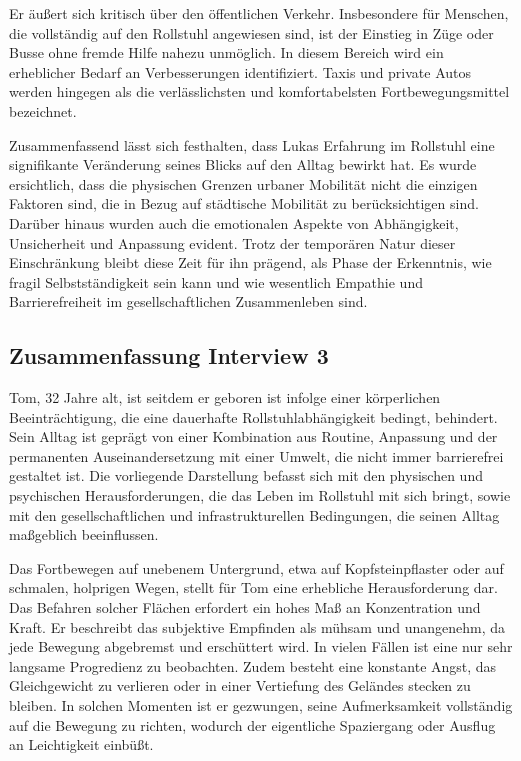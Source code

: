 Er äußert sich kritisch über den öffentlichen Verkehr. Insbesondere für Menschen, die vollständig auf den Rollstuhl angewiesen sind, ist der Einstieg in Züge oder Busse ohne fremde Hilfe nahezu unmöglich. In diesem Bereich wird ein erheblicher Bedarf an Verbesserungen identifiziert. Taxis und private Autos werden hingegen als die verlässlichsten und komfortabelsten Fortbewegungsmittel bezeichnet.

Zusammenfassend lässt sich festhalten, dass Lukas Erfahrung im Rollstuhl eine signifikante Veränderung seines Blicks auf den Alltag bewirkt hat. Es wurde ersichtlich, dass die physischen Grenzen urbaner Mobilität nicht die einzigen Faktoren sind, die in Bezug auf städtische Mobilität zu berücksichtigen sind. Darüber hinaus wurden auch die emotionalen Aspekte von Abhängigkeit, Unsicherheit und Anpassung 
evident. Trotz der temporären Natur dieser Einschränkung bleibt diese Zeit für ihn prägend, als Phase der Erkenntnis, wie fragil Selbstständigkeit sein kann und wie wesentlich Empathie und Barrierefreiheit im gesellschaftlichen Zusammenleben sind.

\cite{ElisaKaltenberger22026}


\subsection{Zusammenfassung Interview 3}
Tom, 32 Jahre alt, ist seitdem er geboren ist infolge einer körperlichen Beeinträchtigung, die eine dauerhafte Rollstuhlabhängigkeit bedingt, behindert. Sein Alltag ist geprägt von einer Kombination aus Routine, Anpassung und der permanenten Auseinandersetzung mit einer Umwelt, die nicht immer barrierefrei gestaltet ist. Die vorliegende Darstellung befasst sich mit den physischen und psychischen Herausforderungen, die das Leben im Rollstuhl mit sich bringt, sowie mit den gesellschaftlichen und infrastrukturellen Bedingungen, die seinen Alltag maßgeblich beeinflussen.

Das Fortbewegen auf unebenem Untergrund, etwa auf Kopfsteinpflaster oder auf schmalen, holprigen Wegen, 
stellt für Tom eine erhebliche Herausforderung dar. Das Befahren solcher Flächen erfordert ein hohes Maß an Konzentration und Kraft. Er beschreibt das subjektive Empfinden als mühsam und unangenehm, da jede Bewegung abgebremst und erschüttert wird. In vielen Fällen ist eine nur sehr langsame Progredienz zu beobachten. Zudem besteht eine konstante Angst, das Gleichgewicht zu verlieren oder in einer Vertiefung des Geländes stecken zu bleiben. In solchen Momenten ist er gezwungen, seine Aufmerksamkeit vollständig auf die Bewegung zu richten, wodurch der eigentliche Spaziergang oder Ausflug an Leichtigkeit einbüßt.

